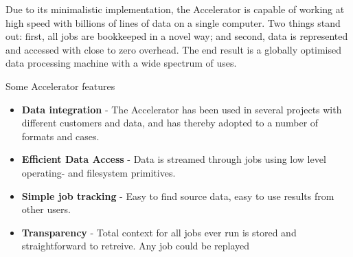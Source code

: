 \documentclass[a4paper]{report}
\begin{document}
Due to its minimalistic implementation, the Accelerator is capable of
working at high speed with billions of lines of data on a single
computer.  Two things stand out: first, all jobs are bookkeeped in a
novel way; and second, data is represented and accessed with close to
zero overhead.  The end result is a globally optimised data processing
machine with a wide spectrum of uses.

Some Accelerator features
\begin{itemize}
\item \textbf{Data integration} - The Accelerator has been used in
  several projects with different customers and data, and has thereby
  adopted to a number of formats and cases.
\item \textbf{Efficient Data Access} - Data is streamed through jobs
  using low level operating- and filesystem primitives.
\item \textbf{Simple job tracking} - Easy to find source data, easy to
  use results from other users.
\item \textbf{Transparency} - Total context for all jobs ever run is
  stored and straightforward to retreive.  Any job could be replayed
\end{itemize}
\end{document}
